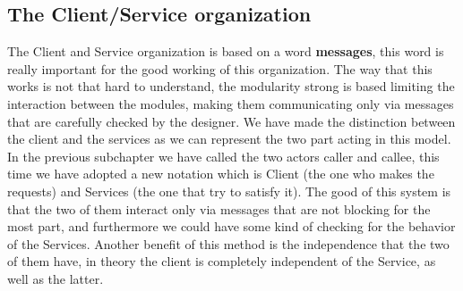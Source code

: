 \documentclass{article}
\begin{document}
  \subsection{The Client/Service organization} 
    The Client and Service organization is based on a word \textbf{messages}, this word is
    really important for the good working of this organization. The way that this works is 
    not that hard to understand, the modularity strong is based limiting the interaction
    between the modules, making them communicating only via messages that are carefully
    checked by the designer. We have made the distinction between the client and the services
    as we can represent the two part acting in this model. In the previous subchapter we 
    have called the two actors caller and callee, this time we have adopted a new notation
    which is Client (the one who makes the requests) and Services (the one that try to satisfy it).
    The good of this system is that the two of them interact only via messages that are not blocking
    for the most part, and furthermore we could have some kind of checking for the behavior of the 
    Services. Another benefit of this method is the independence that the two of them have, 
    in theory the client is completely independent of the Service, as well as the latter.
 
\end{document}
